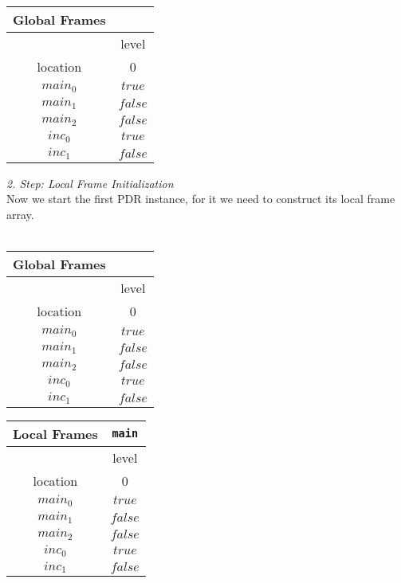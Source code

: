 \documentclass{article}
\begin{document}
	\setlength\tabcolsep{0.35em}
	\begin{center}
		\begin{tabu}{cc}
			Global Frames \\
			\toprule
			& level \\
			\cmidrule(lr){2-2}
			location & 0 \\
			$main_0$ & $true$ \\
			$main_1$ & $false$ \\
			$main_2$ & $false$ \\
			$inc_0$ & $true$ \\
			$inc_1$ & $false$\\
			\bottomrule
		\end{tabu}
	\end{center}
	
	\vspace*{1em}
	\textsl{2. Step: Local Frame Initialization} \\
	
	Now we start the first PDR instance, for it we need to construct its local frame array. \\ \\
	\begin{minipage}{.5\textwidth}
		\setlength\tabcolsep{0.35em}
		\begin{center}
			\begin{tabu}{cc}
				Global Frames \\
				\toprule
				& level \\
				\cmidrule(lr){2-2}
				location & 0 \\
				\cmidrule{1-2}
				$main_0$ & $true$ \\
				$main_1$ & $false$ \\
				$main_2$ & $false$ \\
				$inc_0$ & $true$ \\
				$inc_1$ & $false$\\
				\bottomrule
			\end{tabu}
		\end{center}
	\end{minipage}
	\hfill
	\begin{minipage}{.4\textwidth}
	\setlength\tabcolsep{0.35em}
		\begin{center}
			\begin{tabu}{cc}
				Local Frames & \texttt{main} \\
				\toprule
				& level \\
				\cmidrule(lr){2-2}
				location & 0 \\
				$main_0$ & $true$ \\
				$main_1$ & $false$ \\
				$main_2$ & $false$ \\
				$inc_0$ & $true$ \\
				$inc_1$ & $false$\\
				\bottomrule
			\end{tabu}
		\end{center}	
	\end{minipage}
	
\end{document}
